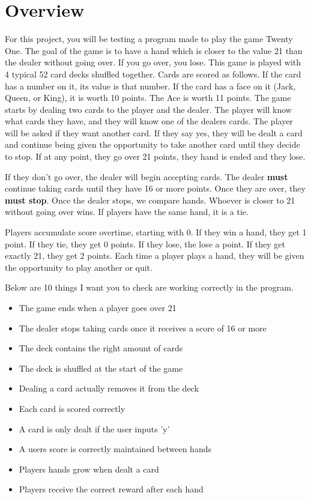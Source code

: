 \documentclass{article}
\begin{document}
\pagestyle{fancy}

\section*{Overview}
For this project, you will be testing a program made to play the game Twenty One.
The goal of the game is to have a hand which is closer to the value 21 than the dealer
without going over. If you go over, you lose. This game is played with 4 typical
52 card decks shuffled together. Cards are scored as follows. If the card has a number
on it, its value is that number. If the card has a face on it (Jack, Queen, or King), it
is worth 10 points. The Ace is worth 11 points. The game starts by dealing two cards to 
the player and the dealer. The player will know what cards they have, and they will know
one of the dealers cards. The player will be asked if they want another card. If they say yes,
they will be dealt a card and continue being given the opportunity to take another card until
they decide to stop. If at any point, they go over 21 points, they hand is ended and they lose.

If they don't go over, the dealer will begin accepting cards. The dealer \textbf{must} continue
taking cards until they have 16 or more points. Once they are over, they \textbf{must stop}. 
Once the dealer stops, we compare hands. Whoever is closer to 21 without going over wins. If
players have the same hand, it is a tie.

Players accumulate score overtime, starting with 0. If they win a hand, they get 1 point. 
If they tie, they get 0 points. If they lose, the lose a point. If they get exactly 21, they
get 2 points. Each time a player plays a hand, they will be given the opportunity to play another
or quit. 

Below are 10 things I want you to check are working correctly in the program.
\begin{itemize}
    \item The game ends when a player goes over 21
    \item The dealer stops taking cards once it receives a score of 16 or more
    \item The deck contains the right amount of cards
    \item The deck is shuffled at the start of the game
    \item Dealing a card actually removes it from the deck
    \item Each card is scored correctly
    \item A card is only dealt if the user inputs 'y'
    \item A users score is correctly maintained between hands
    \item Players hands grow when dealt a card
    \item Players receive the correct reward after each hand
\end{itemize}
\end{document}
